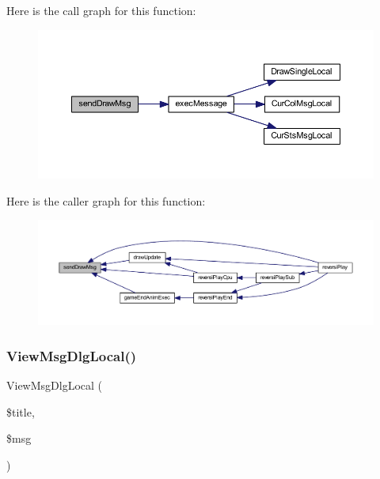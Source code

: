 Here is the call graph for this function\+:
\nopagebreak
\begin{figure}[H]
\begin{center}
\leavevmode
\includegraphics[width=350pt]{class_reversi_play_af27aaf13f15a080c006432338a06c481_cgraph}
\end{center}
\end{figure}
Here is the caller graph for this function\+:
\nopagebreak
\begin{figure}[H]
\begin{center}
\leavevmode
\includegraphics[width=350pt]{class_reversi_play_af27aaf13f15a080c006432338a06c481_icgraph}
\end{center}
\end{figure}
\mbox{\label{class_reversi_play_a2212d70313710a13422dd4fcb5da9cde}} 
\subsubsection{\texorpdfstring{View\+Msg\+Dlg\+Local()}{ViewMsgDlgLocal()}}
{\footnotesize\ttfamily View\+Msg\+Dlg\+Local (\begin{DoxyParamCaption}\item[{}]{\$title,  }\item[{}]{\$msg }\end{DoxyParamCaption})\hspace{0.3cm}{\ttfamily [private]}}



